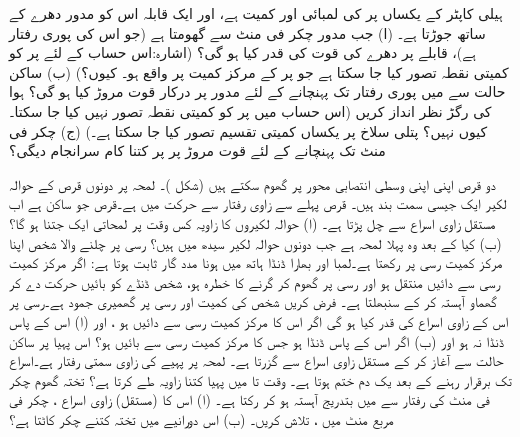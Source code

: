 ہیلی کاپٹر  کے   یکساں پر  کی لمبائی   اور کمیت  ہے، اور ایک  قابلہ    اس کو    مدور دھرے کے ساتھ  جوڑتا ہے۔ (ا) جب مدور  چکر فی منٹ سے گھومتا ہے  (جو اس کی پوری رفتار ہے)، قابلے پر دھرے کی قوت کی قدر کیا ہو گی؟ (اشارہ:اس حساب کے لئے پر کو کمیتی  نقطہ تصور کیا جا سکتا ہے جو پر کے مرکز کمیت پر واقع ہو۔ کیوں؟)  (ب)   ساکن حالت سے  میں پوری رفتار تک  پہنچانے کے لئے  مدور پر درکار قوت مروڑ کیا ہو گی؟ ہوا کی رگڑ نظر انداز کریں (اس حساب میں پر کو کمیتی نقطہ تصور نہیں کیا جا سکتا۔ کیوں نہیں؟ پتلی سلاخ پر یکساں کمیتی تقسیم تصور کیا جا سکتا ہے۔)  (ج)   چکر فی منٹ تک پہنچانے کے لئے قوت مروڑ  پر پر کتنا کام سرانجام  دیگی؟

دو قرص  اپنی اپنی    وسطی انتصابی محور پر گھوم سکتے ہیں (شکل )۔ لمحہ  پر  دونوں قرص کے حوالہ لکیر ایک جیسی سمت بند ہیں۔ قرص  پہلے سے  زاوی رفتار سے حرکت میں ہے۔قرص  جو ساکن ہے  اب  مستقل زاوی  اسراع سے چل پڑتا ہے۔ (ا)   حوالہ لکیروں کا زاویہ کس وقت   پر لمحاتی    ایک  جتنا ہو گا؟ (ب)  کیا  کے بعد     وہ پہلا لمحہ ہے جب دونوں حوالہ لکیر  سیدھ میں  ہیں؟
رسی پر چلنے والا  شخص اپنا مرکز کمیت رسی پر رکھتا ہے۔لمبا اور بھارا    ڈنڈا  ہاتھ میں ہونا   مدد گار ثابت ہوتا ہے: اگر   مرکز کمیت رسی سے دائیں  منتقل  ہو اور رسی پر گھوم کر گرنے کا خطرہ ہو،  شخص  ڈنڈے کو بائیں حرکت دے کر  گھماو  آہستہ کر کے سنبھلتا ہے۔ فرض کریں شخص کی کمیت  اور رسی  پر گھمیری جمود  ہے۔رسی پر اس کے  زاوی اسراع  کی قدر کیا ہو گی  اگر اس کا مرکز کمیت رسی سے  دائیں  ہو ، اور (ا) اس کے پاس ڈنڈا نہ ہو اور (ب) اگر اس کے پاس   ڈنڈا ہو جس کا مرکز کمیت رسی سے  بائیں ہو؟
اس پہیا   پر ساکن حالت سے آغاز کر کے مستقل زاوی اسراع  سے گزرتا ہے۔ لمحہ  پر پہیے کی زاوی سمتی رفتار  ہے۔اسراع  تک برقرار رہنے کے بعد یک دم ختم ہوتا ہے۔ وقت  تا  میں پہیا کتنا زاویہ طے کرتا ہے؟
تختہ گھوم   چکر فی منٹ کی رفتار سے  میں بتدریج آہستہ ہو کر رکتا ہے۔ (ا)  اس کا (مستقل)   زاوی اسراع ، چکر فی مربع منٹ میں ، تلاش کریں۔ (ب) اس دورانیے میں تختہ کتنے چکر کاٹتا ہے؟
